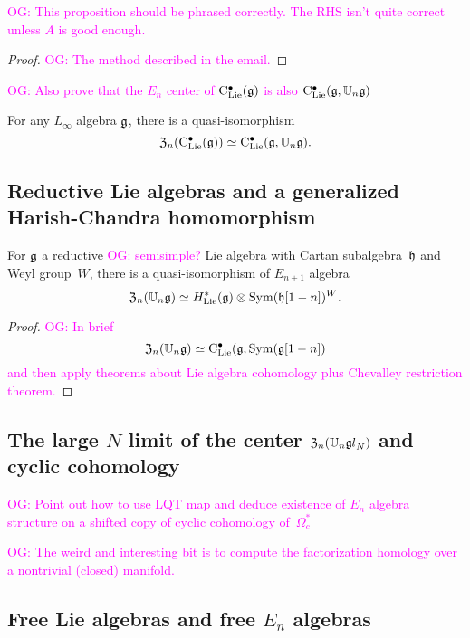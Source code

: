 \documentclass[11pt]{amsart}
\numberwithin{equation}{section}
\def\owen{\textcolor{magenta}{OG: }\textcolor{magenta}}
\begin{document}
\owen{This proposition should be phrased correctly. The RHS isn't quite correct unless $A$ is good enough.}

\begin{proof}
\owen{The method described in the email.}
\end{proof}

\owen{Also prove that the $E_n$ center of ${\rm C}_{\rm Lie}^\bullet(\mathfrak g)$ is also ${\rm C}_{\rm Lie}^\bullet(\mathfrak g, \mathbb U_n \mathfrak g)$}

\begin{cor}
\label{cor: koszul dual to main theorem}
For any $L_\infty$ algebra $\mathfrak g$,
there is a quasi-isomorphism
\[
{\frak Z}_n({\rm C}_{\rm Lie}^\bullet(\mathfrak g)) \simeq {\rm C}_{\rm Lie}^\bullet(\mathfrak g, \mathbb U_n \mathfrak g).
\]
\end{cor}

\subsection{Reductive Lie algebras and a generalized Harish-Chandra homomorphism}

\begin{prp}
For $\mathfrak g$ a reductive \owen{semisimple?} Lie algebra with Cartan subalgebra~$\mathfrak h$ and Weyl group~$W$, 
there is a quasi-isomorphism of $E_{n+1}$ algebra
\[
{\frak Z}_n(\mathbb U_n \mathfrak g) \simeq H^*_{\rm Lie}(\mathfrak g) \otimes {\rm Sym}(\mathfrak h[1-n])^W.
\]
\end{prp}

\begin{proof}
\owen{In brief
\[
{\frak Z}_n(\mathbb U_n \mathfrak g) \simeq {\rm C}_{\rm Lie}^\bullet(\mathfrak g, {\rm Sym}(\mathfrak g[1-n])
\]
and then apply theorems about Lie algebra cohomology plus Chevalley restriction theorem.}
\end{proof}

\subsection{The large $N$ limit of the center ${\frak Z}_n(\mathbb U_n {\frak gl}_N)$ and cyclic cohomology}

\owen{Point out how to use LQT map and deduce existence of $E_n$ algebra structure on a shifted copy of cyclic cohomology of~$\Omega^*_c$}

\owen{The weird and interesting bit is to compute the factorization homology over a nontrivial (closed) manifold.}

\subsection{Free Lie algebras and free $E_n$ algebras}
\end{document}
